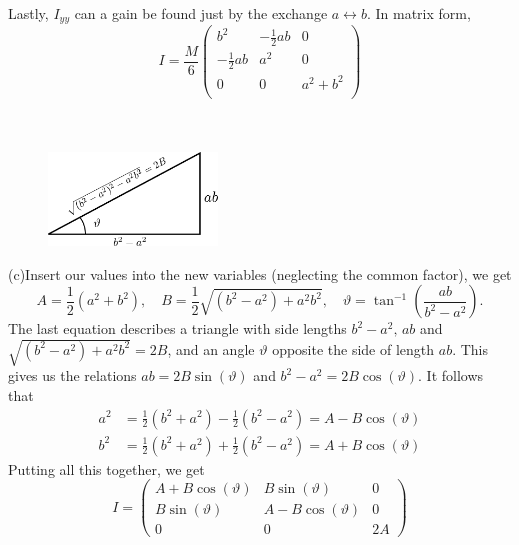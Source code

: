 \documentclass{article}
\begin{document}
        Lastly, $I_{yy}$ can a gain be found just by the exchange $a \leftrightarrow b$. In matrix form,
        \begin{equation*}
            I = \frac{M}{6}
            \begin{pmatrix*}
                b^2 & -\frac{1}{2} ab & 0 \\
                -\frac{1}{2} ab & a^2 & 0 \\
                0 & 0 & a^2 + b^2 \\
            \end{pmatrix*}
        \end{equation*}
        \\ \\
        \begin{figure}
            \includegraphics[width=0.4\textwidth]{figures/exercise_1_triangle2.pdf}
        \end{figure}
        (c)Insert our values into the new variables (neglecting the common factor), we get
        \begin{equation*}
            A = \frac{1}{2}(a^2 + b^2), \quad B = \frac{1}{2}\sqrt{(b^2 - a^2) +a^2b^2}, \quad \vartheta = \tan^{-1}\left( \frac{ab}{b^2 - a^2} \right).
        \end{equation*} 
        \newpage %
        The last equation describes a triangle with side lengths $b^2 - a^2, \, ab$ and $\sqrt{(b^2 - a^2) +a^2b^2} = 2B$, and an angle $\vartheta$ opposite the side of length $ab$. This gives us the relations $ab=2 B \sin(\vartheta)$ and $b^2 - a^2 = 2B \cos(\vartheta)$. It follows that
        \begin{align*}
            a^2 &= \frac{1}{2}(b^2 + a^2)  - \frac{1}{2}(b^2 - a^2) = A - B \cos(\vartheta) \\
        b^2 &= \frac{1}{2}(b^2 + a^2)  + \frac{1}{2}(b^2 - a^2) = A + B \cos(\vartheta)
        \end{align*}
        Putting all this together, we get 
        \begin{equation*}
            I =
            \begin{pmatrix*}
                A + B\cos(\vartheta) & B \sin(\vartheta) & 0 \\
                B \sin(\vartheta) & A - B\cos(\vartheta) & 0 \\
                0 & 0 & 2A
            \end{pmatrix*}
        \end{equation*}
\end{document}
